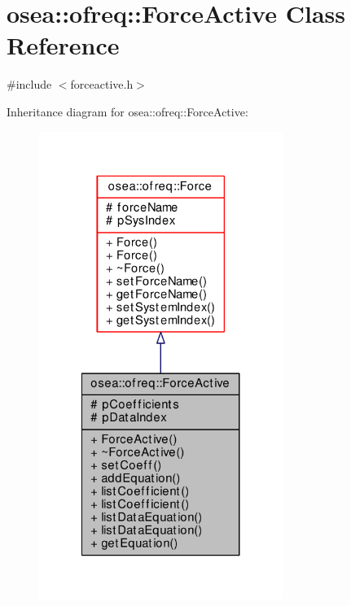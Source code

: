 \hypertarget{classosea_1_1ofreq_1_1_force_active}{\section{osea\-:\-:ofreq\-:\-:Force\-Active Class Reference}
\label{classosea_1_1ofreq_1_1_force_active}
}


{\ttfamily \#include $<$forceactive.\-h$>$}



Inheritance diagram for osea\-:\-:ofreq\-:\-:Force\-Active\-:\nopagebreak
\begin{figure}[H]
\begin{center}
\leavevmode
\includegraphics[width=224pt]{classosea_1_1ofreq_1_1_force_active__inherit__graph}
\end{center}
\end{figure}
